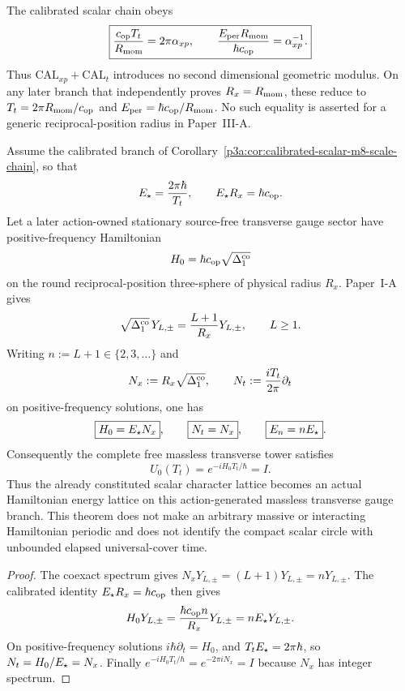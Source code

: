\documentclass[12pt,a4paper]{article}
\begin{document}
\begin{corollary}
\label{p3a:cor:momentum-unit-normal-form}
The calibrated scalar chain obeys
\[
 \boxed{\frac{c_{\rm op}T_t}{R_{\rm mom}}=2\pi\alpha_{xp},\qquad
 \frac{E_{\rm per}R_{\rm mom}}{\hbar c_{\rm op}}=\alpha_{xp}^{-1}.}
\]
Thus \(\mathrm{CAL}_{xp}+\mathrm{CAL}_t\) introduces no second dimensional
geometric modulus.  On any later branch that independently proves
\(R_x=R_{\rm mom}\), these reduce to
\(T_t=2\pi R_{\rm mom}/c_{\rm op}\) and
\(E_{\rm per}=\hbar c_{\rm op}/R_{\rm mom}\).  No such equality is asserted
for a generic reciprocal-position radius in Paper~III-A.
\end{corollary}



\begin{theorem}
\label{p3a:thm:v245-massless-gauge-clock-lock}
Assume the calibrated branch of
Corollary~\ref{p3a:cor:calibrated-scalar-m8-scale-chain}, so that
\[
 E_\star=\frac{2\pi\hbar}{T_t},
 \qquad
 E_\star R_x=\hbar c_{\rm op}.
\]
Let a later action-owned stationary source-free transverse gauge sector have
positive-frequency Hamiltonian
\[
 H_0=\hbar c_{\rm op}\sqrt{\Delta_1^{\rm co}}
\]
on the round reciprocal-position three-sphere of physical radius \(R_x\).
Paper~I-A gives
\[
 \sqrt{\Delta_1^{\rm co}}\,Y_{L,\pm}
 =\frac{L+1}{R_x}Y_{L,\pm},\qquad L\ge1.
\]
Writing \(n:=L+1\in\{2,3,\ldots\}\) and
\[
 N_x:=R_x\sqrt{\Delta_1^{\rm co}},
 \qquad
 N_t:=\frac{iT_t}{2\pi}\partial_t
\]
on positive-frequency solutions, one has
\[
 \boxed{H_0=E_\star N_x},\qquad
 \boxed{N_t=N_x},\qquad
 \boxed{E_n=nE_\star}.
\]
Consequently the complete free massless transverse tower satisfies
\[
 \boxed{U_0(T_t)=e^{-iH_0T_t/\hbar}=I}.
\]
Thus the already constituted scalar character lattice becomes an actual
Hamiltonian energy lattice on this action-generated massless transverse gauge
branch.  This theorem does not make an arbitrary massive or interacting
Hamiltonian periodic and does not identify the compact scalar circle with
unbounded elapsed universal-cover time.
\end{theorem}

\begin{proof}
The coexact spectrum gives \(N_xY_{L,\pm}=(L+1)Y_{L,\pm}=nY_{L,\pm}\).
The calibrated identity \(E_\star R_x=\hbar c_{\rm op}\) then gives
\[
 H_0Y_{L,\pm}
 =\frac{\hbar c_{\rm op}n}{R_x}Y_{L,\pm}
 =nE_\star Y_{L,\pm}.
\]
On positive-frequency solutions \(i\hbar\partial_t=H_0\), and
\(T_tE_\star=2\pi\hbar\), so \(N_t=H_0/E_\star=N_x\).  Finally
\(e^{-iH_0T_t/\hbar}=e^{-2\pi iN_x}=I\) because \(N_x\) has integer spectrum.
\end{proof}
\end{document}
